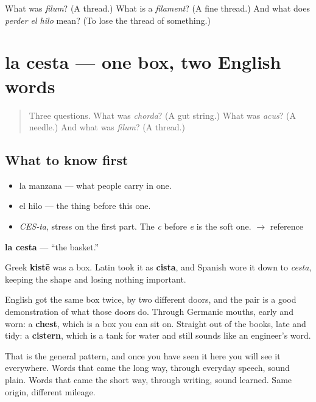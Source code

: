 \begin{tcolorbox}[breakable,colback=teal!4,colframe=teal!35!black,title={Before you move on}]
What was \emph{filum}? (A thread.) What is a \emph{filament}? (A fine thread.) And what does \emph{perder el hilo} mean? (To lose the thread of something.)
\end{tcolorbox}
\section[la cesta]{la cesta — one box, two English words}

\label{lesson:ES-C301-cesta}



\begin{quote}
Three questions. What was \emph{chorda}? (A gut string.) What was \emph{acus}? (A needle.) And what was \emph{filum}? (A thread.)
\end{quote}

\subsection*{What to know first}
\begin{itemize}
\raggedright
  \item la manzana — what people carry in one.
  \item el hilo — the thing before this one.
\end{itemize}

\begin{sounds}
\begin{itemize}
\raggedright
  \item \emph{CES-ta}, stress on the first part. The \emph{c} before \emph{e} is the soft one. $\to$ reference
\end{itemize}
\end{sounds}

\begin{cousinweb}
\textbf{la cesta} — \textquotedblleft{}the basket.\textquotedblright{}

Greek \textbf{kistē} was a box. Latin took it as \textbf{cista}, and Spanish wore it down to \emph{cesta}, keeping the shape and losing nothing important.

English got the same box twice, by two different doors, and the pair is a good demonstration of what those doors do. Through Germanic mouths, early and worn: a \textbf{chest}, which is a box you can sit on. Straight out of the books, late and tidy: a \textbf{cistern}, which is a tank for water and still sounds like an engineer's word.

That is the general pattern, and once you have seen it here you will see it everywhere. Words that came the long way, through everyday speech, sound plain. Words that came the short way, through writing, sound learned. Same origin, different mileage.
\end{cousinweb}

